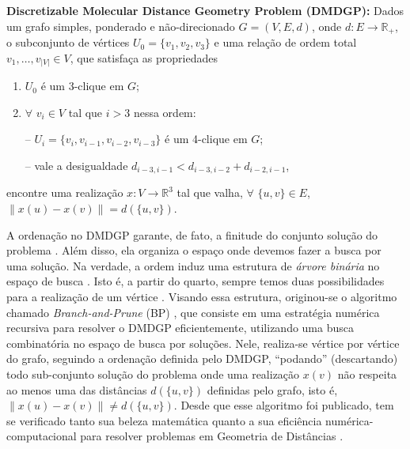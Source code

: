 \documentclass[a4,11pt]{pssbmac}
\begin{document}
	\vspace{0.15cm}
	\textbf{Discretizable Molecular Distance Geometry Problem (DMDGP): }Dados um grafo simples, ponderado e não-direcionado $G = (V,E,d)$, onde $d: E \rightarrow \mathbb{R}_{+}$, o subconjunto de vértices $U_{0} = \{v_{1},v_{2},v_{3} \}$ e uma relação de ordem total $v_1, \dots, v_{|V|} \in V$, que satisfaça as propriedades
	\begin{enumerate}
		\item $U_{0}$ é um 3-clique em $G$;
		\vspace{-0.6cm}
		\item 
		\begin{minipage}{0.4\linewidth}  
			$\forall$ $v_{i} \in V$ tal que $i > 3$ nessa ordem:
		\end{minipage}
		\begin{minipage}{0.6\linewidth}
			\vspace{0.6cm}
			-- $U_{i} = \{v_i, v_{i-1}, v_{i-2}, v_{i-3}\}$ é um 4-clique em $G$;
			\vspace{0.2cm}
						
			-- vale a desigualdade $d_{i-3,i-1} < d_{i-3,i-2} + d_{i-2,i-1}$,
		\end{minipage}
		
	\end{enumerate}
	encontre uma realização $x: V \rightarrow \mathbb{R}^{3}$ tal que valha, $\forall$ $\{u,v\} \in E$, $\left\| x(u) - x(v) \right\| = d(\{u,v\})$.
	\vspace{0.15cm}
	
	A ordenação no DMDGP garante, de fato, a finitude do conjunto solução do problema \cite{carlileBook31Coloquio}. Além disso, ela organiza o espaço onde devemos fazer a busca por uma solução. Na verdade, a ordem induz uma estrutura de \textit{árvore binária} no espaço de busca \cite{fidalgotese}. Isto é, a partir do quarto, sempre temos duas possibilidades para a realização de um vértice \cite{carlileGDandAplications}. Visando essa estrutura, originou-se o algoritmo chamado \textit{Branch-and-Prune} (BP) \cite{fidalgotese}, que consiste em uma estratégia numérica recursiva para resolver o DMDGP eficientemente, utilizando uma busca combinatória no espaço de busca por soluções. Nele, realiza-se vértice por vértice do grafo, seguindo a ordenação definida pelo DMDGP, ``podando'' (descartando) todo sub-conjunto solução do problema onde uma realização $x(v)$ não respeita ao menos uma das distâncias $d(\{u,v\})$ definidas pelo grafo, isto é, $\left\| x(u) - x(v) \right\| \neq d(\{u,v\})$. Desde que esse algoritmo foi publicado, tem se verificado tanto sua beleza matemática quanto a sua eficiência numérica-computacional para resolver problemas em Geometria de Distâncias \cite{fidalgotese}. 
	
\end{document}
